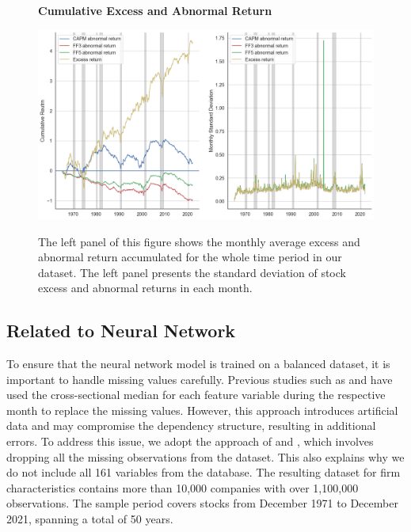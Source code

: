 \begin{figure}[H]
  \centering
  \caption{\textbf{Cumulative Excess and Abnormal Return}}
  \includegraphics[width=.8\textwidth]{images/abnormal_excess_return.png}
  \label{fig: abnormal_excess_return}
  \caption*{\footnotesize{The left panel of this figure shows the monthly average excess and abnormal return accumulated for the whole time period in our dataset. The left panel presents the standard deviation of stock excess and abnormal returns in each month.}}
\end{figure} 

\subsection{Related to Neural Network}

To ensure that the neural network model is trained on a balanced dataset, it is important to handle missing values carefully. Previous studies such as \citet*{gu2020empirical} and \citet*{gu2019autoencoder} have used the cross-sectional median for each feature variable during the respective month to replace the missing values. However, this approach introduces artificial data and may compromise the dependency structure, resulting in additional errors. To address this issue, we adopt the approach of \citet*{kelly2019characteristics} and \citet*{chen2019deep}, which involves dropping all the missing observations from the dataset. This also explains why we do not include all 161 variables from the database. The resulting dataset for firm characteristics contains more than 10,000 companies with over 1,100,000 observations. The sample period covers stocks from December 1971 to December 2021, spanning a total of 50 years.

